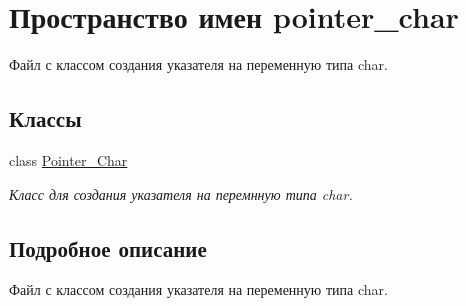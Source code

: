 \hypertarget{namespacepointer__char}{}\section{Пространство имен pointer\+\_\+char}
\label{namespacepointer__char}


Файл с классом создания указателя на переменную типа char.  


\subsection*{Классы}
\begin{DoxyCompactItemize}
\item 
class \mbox{\hyperlink{classpointer__char_1_1_pointer___char}{Pointer\+\_\+\+Char}}
\begin{DoxyCompactList}\small\item\em Класс для создания указателя на перемнную типа char. \end{DoxyCompactList}\end{DoxyCompactItemize}


\subsection{Подробное описание}
Файл с классом создания указателя на переменную типа char. 

